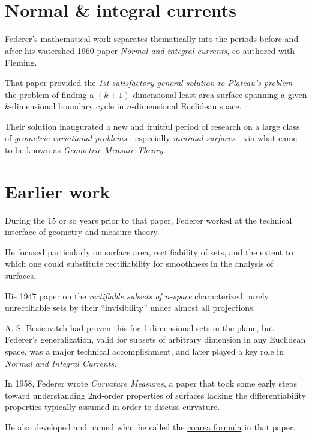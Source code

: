 \documentclass{book}
\numberwithin{equation}{section}
\begin{document}
\section{Normal \& integral currents}
Federer's mathematical work separates thematically into the periods before and after his watershed 1960 paper \textit{Normal and integral currents}, co-authored with Fleming.

That paper provided the \textit{1st satisfactory general solution to \href{https://en.wikipedia.org/wiki/Plateau's_problem}{Plateau's problem}} - the problem of finding a $(k + 1)$-dimensional least-area surface spanning a given $k$-dimensional boundary cycle in $n$-dimensional Euclidean space.

Their solution inaugurated a new and fruitful period of research on a large class of \textit{geometric variational problems} - especially \textit{minimal surfaces} - via what came to be known as \textit{Geometric Measure Theory}.

\section{Earlier work}
During the 15 or so years prior to that paper, Federer worked at the technical interface of geometry and measure theory.

He focused particularly on surface area, rectifiability of sets, and the extent to which one could substitute rectifiability for smoothness in the analysis of surfaces.

His 1947 paper on the \textit{rectifiable subsets of $n$-space} characterized purely unrectifiable sets by their ``invisibility'' under almost all projections.

\href{https://en.wikipedia.org/wiki/Abram_Samoilovitch_Besicovitch}{A. S. Besicovitch} had proven this for 1-dimensional sets in the plane, but Federer's generalization, valid for subsets of arbitrary dimension in any Euclidean space, was a major technical accomplishment, and later played a key role in \textit{Normal and Integral Currents}.

%
In 1958, Federer wrote \textit{Curvature Measures}, a paper that took some early steps toward understanding 2nd-order properties of surfaces lacking the differentiability properties typically assumed in order to discuss curvature.

He also developed and named what he called the \href{https://en.wikipedia.org/wiki/Coarea_formula}{coarea formula} in that paper.
\end{document}
